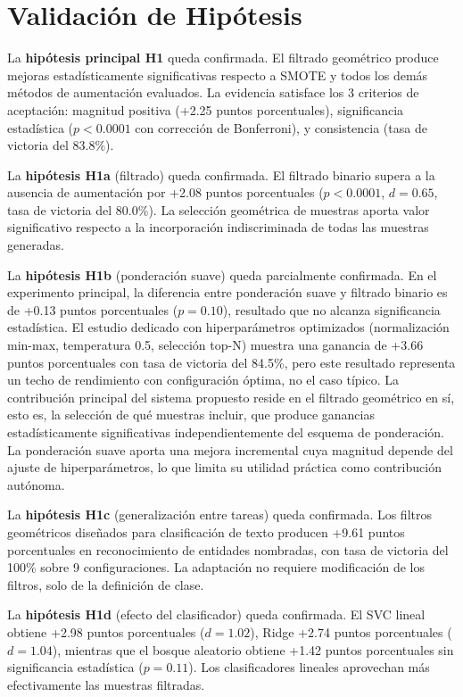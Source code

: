\section{Validación de Hipótesis}
\label{sec:validacion_hipotesis}

La \textbf{hipótesis principal H1} queda confirmada. El filtrado geométrico produce mejoras estadísticamente significativas respecto a SMOTE y todos los demás métodos de aumentación evaluados. La evidencia satisface los 3 criterios de aceptación: magnitud positiva (+2.25 puntos porcentuales), significancia estadística ($p < 0.0001$ con corrección de Bonferroni), y consistencia (tasa de victoria del 83.8\%).

La \textbf{hipótesis H1a} (filtrado) queda confirmada. El filtrado binario supera a la ausencia de aumentación por +2.08 puntos porcentuales ($p < 0.0001$, $d = 0.65$, tasa de victoria del 80.0\%). La selección geométrica de muestras aporta valor significativo respecto a la incorporación indiscriminada de todas las muestras generadas.

La \textbf{hipótesis H1b} (ponderación suave) queda parcialmente confirmada. En el experimento principal, la diferencia entre ponderación suave y filtrado binario es de +0.13 puntos porcentuales ($p = 0.10$), resultado que no alcanza significancia estadística. El estudio dedicado con hiperparámetros optimizados (normalización min-max, temperatura 0.5, selección top-N) muestra una ganancia de +3.66 puntos porcentuales con tasa de victoria del 84.5\%, pero este resultado representa un techo de rendimiento con configuración óptima, no el caso típico. La contribución principal del sistema propuesto reside en el filtrado geométrico en sí, esto es, la selección de qué muestras incluir, que produce ganancias estadísticamente significativas independientemente del esquema de ponderación. La ponderación suave aporta una mejora incremental cuya magnitud depende del ajuste de hiperparámetros, lo que limita su utilidad práctica como contribución autónoma.

La \textbf{hipótesis H1c} (generalización entre tareas) queda confirmada. Los filtros geométricos diseñados para clasificación de texto producen +9.61 puntos porcentuales en reconocimiento de entidades nombradas, con tasa de victoria del 100\% sobre 9 configuraciones. La adaptación no requiere modificación de los filtros, solo de la definición de clase.

La \textbf{hipótesis H1d} (efecto del clasificador) queda confirmada. El SVC lineal obtiene +2.98 puntos porcentuales ($d = 1.02$), Ridge +2.74 puntos porcentuales ($d = 1.04$), mientras que el bosque aleatorio obtiene +1.42 puntos porcentuales sin significancia estadística ($p = 0.11$). Los clasificadores lineales aprovechan más efectivamente las muestras filtradas.


